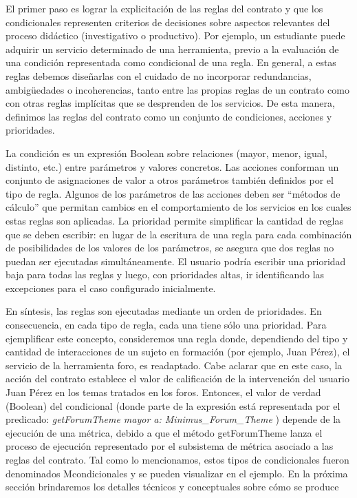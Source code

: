 {El primer paso es lograr la explicitación de las reglas del contrato y que
los condicionales representen criterios de decisiones sobre aspectos relevantes
del proceso didáctico (investigativo o productivo). Por ejemplo, un estudiante
puede adquirir un servicio determinado de una herramienta, previo a la
evaluación de una condición representada como condicional de una regla.
En general, a estas reglas debemos diseñarlas con el cuidado de no incorporar
redundancias, ambigüedades o incoherencias, tanto entre las propias
reglas de un contrato como con otras reglas implícitas que se desprenden de
los servicios. De esta manera, definimos las reglas del contrato como un conjunto
de condiciones, acciones y prioridades.

La condición es un expresión Boolean sobre relaciones (mayor, menor,
igual, distinto, etc.) entre parámetros y valores concretos.
Las acciones conforman un conjunto de asignaciones de valor a otros parámetros
también definidos por el tipo de regla. Algunos de los parámetros de
las acciones deben ser “métodos de cálculo” que permitan cambios en el comportamiento
de los servicios en los cuales estas reglas son aplicadas.
La prioridad permite simplificar la cantidad de reglas que se deben escribir:
en lugar de la escritura de una regla para cada combinación de posibilidades
de los valores de los parámetros, se asegura que dos reglas no puedan ser
ejecutadas simultáneamente. El usuario podría escribir una prioridad baja para
todas las reglas y luego, con prioridades altas, ir identificando las excepciones
para el caso configurado inicialmente.

En síntesis, las reglas son ejecutadas mediante un orden de prioridades. En
consecuencia, en cada tipo de regla, cada una tiene sólo una prioridad.
Para ejemplificar este concepto, consideremos una regla donde, dependiendo
del tipo y cantidad de interacciones de un sujeto en formación (por
ejemplo, Juan Pérez), el servicio de la herramienta foro, es readaptado. Cabe
aclarar que en este caso, la acción del contrato establece el valor de calificación
de la intervención del usuario Juan Pérez en los temas tratados en los
foros. Entonces, el valor de verdad (Boolean) del condicional (donde parte de
la expresión está representada por el predicado: \textit{getForumTheme mayor a:
Minimus\_Forum\_Theme} ) depende de la ejecución de una métrica, debido a
que el método getForumTheme lanza el proceso de ejecución representado por
el subsistema de métrica asociado a las reglas del contrato.
Tal como lo mencionamos, estos tipos de condicionales fueron denominados
Mcondicionales y se pueden visualizar en el ejemplo. En la próxima sección
brindaremos los detalles técnicos y conceptuales sobre cómo se produce

}
